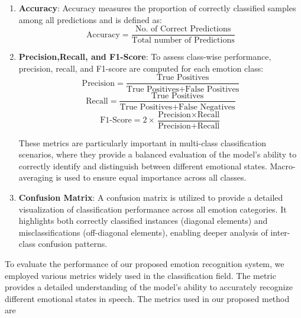\documentclass[iicol,sn-mathphys-num]{sn-jnl}%
\theoremstyle{thmstyleone}%
\theoremstyle{thmstyletwo}%
\theoremstyle{thmstylethree}%
\begin{document}
\begin{enumerate}
  
    \item \textbf{Accuracy}: Accuracy measures the proportion of correctly classified samples among all predictions and is defined as:
         \begin{equation}
             \text{Accuracy} = \frac{\text{No. of Correct Predictions}}{\text{Total number of Predictions}}
        \end{equation}
     \item \textbf{Precision,Recall, and F1-Score}:
    To assess class-wise performance, precision, recall, and F1-score are computed for each emotion class:
    \begin{equation}
        \text{Precision} = \frac{\text{True Positives}}{\text{True Positives} + \text{False Positives}}
     \end{equation}
    \begin{equation}
        \text{Recall} = \frac{\text{True Positives}}{\text{True Positives} + \text{False Negatives}}
    \end{equation}
     \begin{equation}
        \text{F1-Score} = 2 \times \frac{\text{Precision} \times \text{Recall}}{\text{Precision} + \text{Recall}}
    \end{equation}
         
    These metrics are particularly important in multi-class classification scenarios, where they provide a balanced evaluation of the model’s ability to correctly identify and distinguish between different emotional states. Macro-averaging is used to ensure equal importance across all classes.

     \item \textbf{Confusion Matrix}: A confusion matrix is utilized to provide a detailed visualization of classification performance across all emotion categories. It highlights both correctly classified instances (diagonal elements) and misclassifications (off-diagonal elements), enabling deeper analysis of inter-class confusion patterns.
    
\end{enumerate}



\iffalse  
To evaluate the performance of our proposed emotion recognition system, we employed various metrics widely used in the classification field. The metric provides a detailed understanding of the model's ability to accurately recognize different emotional states in speech. The metrics used in our proposed method are
\end{document}
